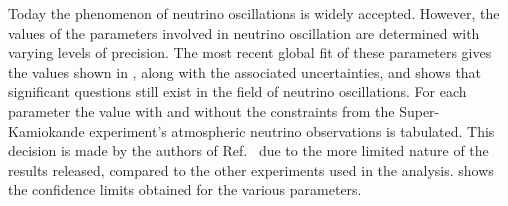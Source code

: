 
Today the phenomenon of neutrino oscillations is widely accepted. 
However, the values of the parameters involved in neutrino oscillation are determined with varying levels of precision.
The most recent global fit of these parameters gives the values shown in , along with the associated uncertainties, and shows that significant questions still exist in the field of neutrino oscillations.
For each parameter the value with and without the constraints from the Super-Kamiokande experiment's atmospheric neutrino observations is tabulated.
This decision is made by the authors of Ref.~\cite{nufit5} due to the more limited nature of the results released, compared to the other experiments used in the analysis.
 shows the confidence limits obtained for the various parameters.

